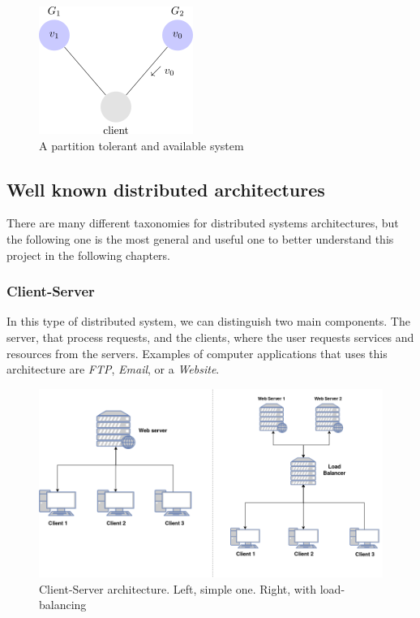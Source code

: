 \begin{figure}[h!]
    \includegraphics[scale=0.6]{assets/images/cap26.png}
    \caption{A partition tolerant and available system}
    \label{fig:non-cap-system}
\end{figure}

\subsection{Well known distributed architectures}
There are many different taxonomies for distributed systems architectures, but the following one is the most general and useful one to better understand this project in the following chapters.

\subsubsection*{Client-Server}
In this type of distributed system, we can distinguish two main components. The server, that process requests, and the clients, where the user requests services and resources from the servers. Examples of computer applications that uses this architecture are \textit{FTP}, \textit{Email}, or a \textit{Website}.

\begin{figure}[h!]
\centering
    \includegraphics[width=\linewidth]{assets/images/client-server.png}
    \caption{Client-Server architecture. Left, simple one. Right, with load-balancing}
    \label{fig:client-server}
\end{figure}

